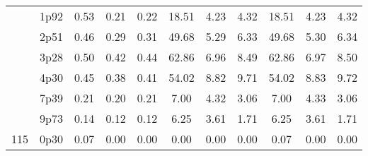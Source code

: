 \documentclass[12pt,A4paper]{article}
\begin{document}
\begin{table}[]
\begin{tabular}{lllllllllll}
\multicolumn{1}{|l|}{} & \multicolumn{1}{l|}{1p92} & \multicolumn{1}{c|}{0.53}        & \multicolumn{1}{c|}{0.21}         & \multicolumn{1}{c|}{0.22}        & \multicolumn{1}{c|}{18.51}         & \multicolumn{1}{c|}{4.23}        & \multicolumn{1}{c|}{4.32}        & \multicolumn{1}{c|}{18.51}        & \multicolumn{1}{c|}{4.23}        & \multicolumn{1}{c|}{4.32}         \\ \cline{2-11}
\multicolumn{1}{|l|}{} & \multicolumn{1}{l|}{2p51} & \multicolumn{1}{c|}{0.46}        & \multicolumn{1}{c|}{0.29}         & \multicolumn{1}{c|}{0.31}        & \multicolumn{1}{c|}{49.68}         & \multicolumn{1}{c|}{5.29}        & \multicolumn{1}{c|}{6.33}        & \multicolumn{1}{c|}{49.68}        & \multicolumn{1}{c|}{5.30}        & \multicolumn{1}{c|}{6.34}         \\ \cline{2-11}
\multicolumn{1}{|l|}{} & \multicolumn{1}{l|}{3p28} & \multicolumn{1}{c|}{0.50}        & \multicolumn{1}{c|}{0.42}         & \multicolumn{1}{c|}{0.44}        & \multicolumn{1}{c|}{62.86}         & \multicolumn{1}{c|}{6.96}        & \multicolumn{1}{c|}{8.49}        & \multicolumn{1}{c|}{62.86}        & \multicolumn{1}{c|}{6.97}        & \multicolumn{1}{c|}{8.50}         \\ \cline{2-11}
\multicolumn{1}{|l|}{} & \multicolumn{1}{l|}{4p30} & \multicolumn{1}{c|}{0.45}        & \multicolumn{1}{c|}{0.38}         & \multicolumn{1}{c|}{0.41}        & \multicolumn{1}{c|}{54.02}         & \multicolumn{1}{c|}{8.82}        & \multicolumn{1}{c|}{9.71}        & \multicolumn{1}{c|}{54.02}        & \multicolumn{1}{c|}{8.83}        & \multicolumn{1}{c|}{9.72}         \\ \cline{2-11}
\multicolumn{1}{|l|}{} & \multicolumn{1}{l|}{7p39} & \multicolumn{1}{c|}{0.21}        & \multicolumn{1}{c|}{0.20}         & \multicolumn{1}{c|}{0.21}        & \multicolumn{1}{c|}{7.00}         & \multicolumn{1}{c|}{4.32}        & \multicolumn{1}{c|}{3.06}        & \multicolumn{1}{c|}{7.00}        & \multicolumn{1}{c|}{4.33}        & \multicolumn{1}{c|}{3.06}         \\ \cline{2-11}
\multicolumn{1}{|l|}{} & \multicolumn{1}{l|}{9p73} & \multicolumn{1}{c|}{0.14}        & \multicolumn{1}{c|}{0.12}         & \multicolumn{1}{c|}{0.12}        & \multicolumn{1}{c|}{6.25}         & \multicolumn{1}{c|}{3.61}        & \multicolumn{1}{c|}{1.71}        & \multicolumn{1}{c|}{6.25}        & \multicolumn{1}{c|}{3.61}        & \multicolumn{1}{c|}{1.71}         \\ \hline
\multicolumn{1}{|l|}{\multirow{12}{*}{115}} & \multicolumn{1}{l|}{0p30} & \multicolumn{1}{c|}{0.07}        & \multicolumn{1}{c|}{0.00}         & \multicolumn{1}{c|}{0.00}        & \multicolumn{1}{c|}{0.00}         & \multicolumn{1}{c|}{0.00}        & \multicolumn{1}{c|}{0.00}         & \multicolumn{1}{c|}{0.07}         & \multicolumn{1}{c|}{0.00}         & \multicolumn{1}{c|}{0.00}         \\ \cline{2-11} 

\end{tabular}
\end{table}
\end{document}
